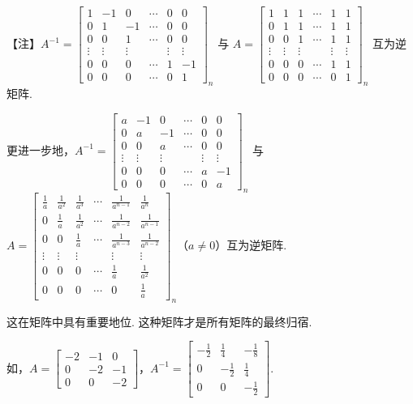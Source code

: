 \begin{fnote}
【注】$A^{-1}=\begin{bmatrix}1&-1&0&\cdots&0&0\\0&1&-1&\cdots&0&0\\0&0&1&\cdots&0&0\\\vdots&\vdots&\vdots&&\vdots&\vdots\\0&0&0&\cdots&1&-1\\0&0&0&\cdots&0&1\end{bmatrix}_n$ 与 $A=\begin{bmatrix}1&1&1&\cdots&1&1\\0&1&1&\cdots&1&1\\0&0&1&\cdots&1&1\\\vdots&\vdots&\vdots&&\vdots&\vdots\\0&0&0&\cdots&1&1\\0&0&0&\cdots&0&1\end{bmatrix}_n$ 互为逆矩阵.

更进一步地，$A^{-1}=\begin{bmatrix}a&-1&0&\cdots&0&0\\0&a&-1&\cdots&0&0\\0&0&a&\cdots&0&0\\\vdots&\vdots&\vdots&&\vdots&\vdots\\0&0&0&\cdots&a&-1\\0&0&0&\cdots&0&a\end{bmatrix}_n$ 与 $A=\begin{bmatrix}\frac1a&\frac1{a^2}&\frac1{a^3}&\cdots&\frac1{a^{n-1}}&\frac1{a^n}\\0&\frac1a&\frac1{a^2}&\cdots&\frac1{a^{n-2}}&\frac1{a^{n-1}}\\0&0&\frac1a&\cdots&\frac1{a^{n-3}}&\frac1{a^{n-2}}\\\vdots&\vdots&\vdots&&\vdots&\vdots\\0&0&0&\cdots&\frac1a&\frac1{a^2}\\0&0&0&\cdots&0&\frac1a\end{bmatrix}_n$（$a\ne0$）互为逆矩阵.

这在矩阵中具有重要地位. 这种矩阵才是所有矩阵的最终归宿.

如，$A=\begin{bmatrix}-2&-1&0\\0&-2&-1\\0&0&-2\end{bmatrix}$，$A^{-1}=\begin{bmatrix}-\frac12&\frac14&-\frac18\\0&-\frac12&\frac14\\0&0&-\frac12\end{bmatrix}$.
\end{fnote}

